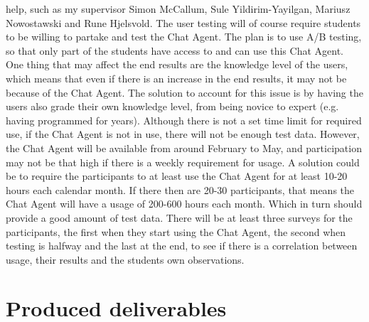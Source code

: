help, such as my supervisor Simon McCallum, Sule Yildirim-Yayilgan, Mariusz Nowostawski and Rune Hjelsvold. 
\vspace{0.5em}\newline
The user testing will of course require students to be willing to partake and test the Chat Agent. The plan is to use A/B testing, so that only part of the students have access to and 
can use this Chat Agent. One thing that may affect the end results are the knowledge level of the users, which means that even if there is an increase in the end results, it may not 
be because of the Chat Agent. The solution to account for this issue is by having the users also grade their own knowledge level, from being novice to expert (e.g. having programmed 
for years). Although there is not a set time limit for required use, if the Chat Agent is not in use, there will not be enough test data. However, the Chat Agent will be available from 
around February to May, and participation may not be that high if there is a weekly requirement for usage. A solution could be to require the participants to at least use the Chat Agent 
for at least 10-20 hours each calendar month. If there then are 20-30 participants, that means the Chat Agent will have a usage of 200-600 hours each month. Which in turn should provide 
a good amount of test data. There will be at least three surveys for the participants, the first when they start using the Chat Agent, the second when testing is halfway and the last 
at the end, to see if there is a correlation between usage, their results and the students own observations.

\section{Produced deliverables}
\label{chapter5:produced_deliverables}

